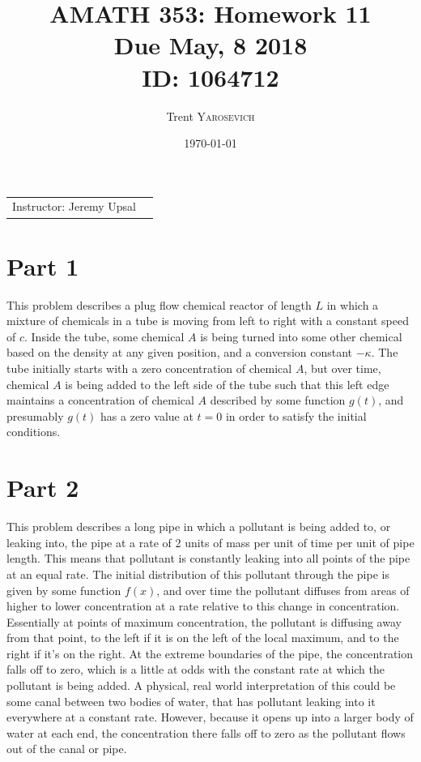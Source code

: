 \documentclass{article}
\title{AMATH 353: Homework 11 \\Due May, 8 2018 \\ ID: 1064712} %
\author{Trent \textsc{Yarosevich}} %
\date{\today} %
\begin{document}
\maketitle %
\setlength\parindent{1cm}

\begin{center}
\begin{tabular}{l r}
Instructor: Jeremy Upsal %
\end{tabular}
\end{center}


\section*{Part 1}
This problem describes a plug flow chemical reactor of length $L$ in which a mixture of chemicals in a tube is moving from left to right with a constant speed of $c$. Inside the tube, some chemical $A$ is being turned into some other chemical based on the density at any given position, and a conversion constant $-\kappa$. The tube initially starts with a zero concentration of chemical $A$, but over time, chemical $A$ is being added to the left side of the tube such that this left edge maintains a concentration of chemical $A$ described by some function $g(t)$, and presumably $g(t)$ has a zero value at $t=0$ in order to satisfy the initial conditions.
\section*{Part 2}
This problem describes a long pipe in which a pollutant is being added to, or leaking into, the pipe at a rate of 2 units of mass per unit of time per unit of pipe length. This means that pollutant is constantly leaking into all points of the pipe at an equal rate. The initial distribution of this pollutant through the pipe is given by some function $f(x)$, and over time the pollutant diffuses from areas of higher to lower concentration at a rate relative to this change in concentration. Essentially at points of maximum concentration, the pollutant is diffusing away from that point, to the left if it is on the left of the local maximum, and to the right if it's on the right. At the extreme boundaries of the pipe, the concentration falls off to zero, which is a little at odds with the constant rate at which the pollutant is being added. A physical, real world interpretation of this could be some canal between two bodies of water, that has pollutant leaking into it everywhere at a constant rate. However, because it opens up into a larger body of water at each end, the concentration there falls off to zero as the pollutant flows out of the canal or pipe. 
\end{document}
